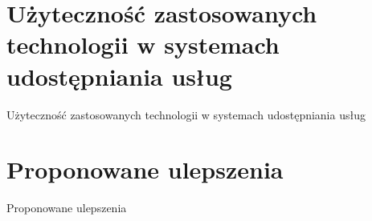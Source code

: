 
\section{Użyteczność zastosowanych technologii w systemach udostępniania usług}
\label{sec:uzytecznosc}

Użyteczność zastosowanych technologii w systemach udostępniania usług


\section{Proponowane ulepszenia}
\label{sec:ulepszenia}

Proponowane ulepszenia

